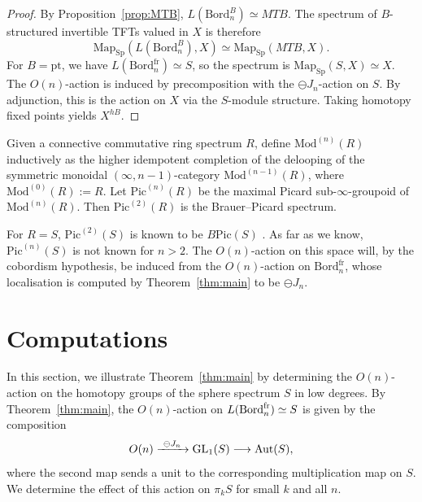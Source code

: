 \documentclass{amsart}
\begin{document}
\begin{proof}
By Proposition~\ref{prop:MTB}, $L(\mathrm{Bord}_n^B) \simeq MTB$. The spectrum of $B$-structured invertible TFTs valued in $X$ is therefore
\[
\mathrm{Map}_{\mathrm{Sp}}(L(\mathrm{Bord}_n^B), X) \simeq \mathrm{Map}_{\mathrm{Sp}}(MTB, X).
\]
For $B = \mathrm{pt}$, we have $L(\mathrm{Bord}_n^{\mathrm{fr}}) \simeq S$, so the spectrum is $\mathrm{Map}_{\mathrm{Sp}}(S, X) \simeq X$. The $O(n)$-action is induced by precomposition with the $\ominus J_n$-action on $S$. By adjunction, this is the action on $X$ via the $S$-module structure. Taking homotopy fixed points yields $X^{hB}$.
\end{proof}
\begin{remark}[Conjectural]
\label{rem:Pic-n-S}
Given a connective commutative ring spectrum $R$, define $\mathrm{Mod}^{(n)}(R)$ inductively as the higher idempotent completion \cite{gaiotto2019condensations} of the delooping of the symmetric monoidal $(\infty,n-1)$-category $\mathrm{Mod}^{(n-1)}(R)$, where $\mathrm{Mod}^{(0)}(R) := R$. Let $\mathrm{Pic}^{(n)}(R)$ be the maximal Picard sub-$\infty$-groupoid of $\mathrm{Mod}^{(n)}(R)$. Then $\mathrm{Pic}^{(2)}(R)$ is the Brauer--Picard spectrum.

For $R = S$, $\mathrm{Pic}^{(2)}(S)$ is known to be $B\mathrm{Pic}(S)$ \cite{MR3190610}. As far as we know, $\mathrm{Pic}^{(n)}(S)$ is not known for $n > 2$. The $O(n)$-action on this space will, by the cobordism hypothesis, be induced from the $O(n)$-action on $\mathrm{Bord}_n^{\mathrm{fr}}$, whose localisation is computed by Theorem~\ref{thm:main} to be $\ominus J_n$.
\end{remark}
\section{Computations}\label{sec:computations}

In this section, we illustrate Theorem~\ref{thm:main} by determining the $O(n)$-action on the homotopy groups of the sphere spectrum $S$ in low degrees. By Theorem~\ref{thm:main}, the $O(n)$-action on $L(\operatorname{Bord}_n^{\mathrm{fr}}) \simeq S$ is given by the composition
\[
O(n) \xrightarrow{\ \ominus J_n\ } \GL_1(S) \longrightarrow \Aut(S),
\]
where the second map sends a unit to the corresponding multiplication map on $S$.
 We determine the effect of this action on $\pi_k S$ for small $k$ and all $n$.



\end{document}
